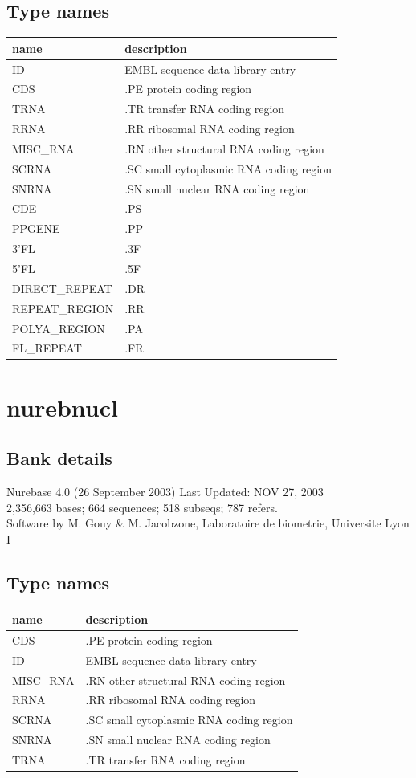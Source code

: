 \documentclass{article}
\begin{document}
\begin{Schunk}
\subsection{Type names}
\noindent\begin{tabular}{ll}
\hline \hline
name & description\\
\hline
ID & EMBL sequence data library entry \\
CDS & .PE protein coding region \\
TRNA & .TR transfer RNA coding region \\
RRNA & .RR ribosomal RNA coding region \\
MISC\_RNA & .RN other structural RNA coding region \\
SCRNA & .SC small cytoplasmic RNA coding region \\
SNRNA & .SN small nuclear RNA coding region \\
CDE & .PS \\
PPGENE & .PP \\
3'FL & .3F \\
5'FL & .5F \\
DIRECT\_REPEAT & .DR \\
REPEAT\_REGION & .RR \\
POLYA\_REGION & .PA \\
FL\_REPEAT & .FR \\
\hline \hline
\end{tabular}

\section{ nurebnucl }
\subsection{Bank details}
Nurebase 4.0 (26 September 2003) Last Updated: NOV 27, 2003\\
2,356,663 bases; 664 sequences; 518 subseqs; 787 refers.\\
Software by M. Gouy \& M. Jacobzone, Laboratoire de biometrie, Universite Lyon I

\subsection{Type names}
\noindent\begin{tabular}{ll}
\hline \hline
name & description\\
\hline
CDS & .PE protein coding region \\
ID & EMBL sequence data library entry \\
MISC\_RNA & .RN other structural RNA coding region \\
RRNA & .RR ribosomal RNA coding region \\
SCRNA & .SC small cytoplasmic RNA coding region \\
SNRNA & .SN small nuclear RNA coding region \\
TRNA & .TR transfer RNA coding region \\
\hline \hline
\end{tabular}


\end{Schunk}
\end{document}

